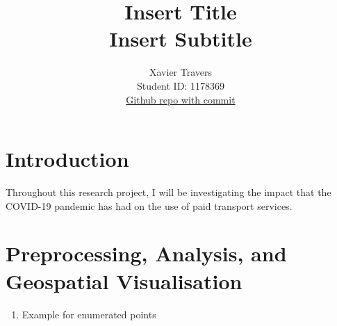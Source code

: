 \documentclass[11pt]{article}
\title{\textbf{Insert Title} \\ Insert Subtitle}
\author{
Xavier Travers \\
Student ID: 1178369 \\
\href{https://github.com/MAST30034-Applied-Data-Science/mast30034\_p1\_template/tree/fd9f1dd17fdbcb5b119b70c93a22da8210d44fd7}{Github repo with commit}
}
\begin{document}
\maketitle

\section{Introduction}

Throughout this research project, I will be investigating the impact that the COVID-19 pandemic has had on the use of paid transport services.






\section{Preprocessing, Analysis, and Geospatial Visualisation}
\begin{enumerate} 
    \item Example for enumerated points
\end{enumerate}
\end{document}
